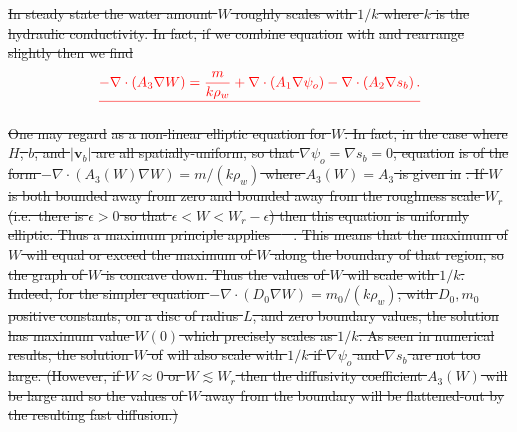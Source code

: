 \documentclass[gmd]{copernicus}   %
\newcommand\bv{\mathbf{v}}
\newcommand{\Div}{\nabla\cdot}
\newcommand\eps{\epsilon}
\newcommand{\grad}{\nabla}
\providecommand{\DIFdel}[1]{{\protect\color{red}\sout{#1}}}                      %
\providecommand{\DIFdelbegin}{} %
\providecommand{\DIFdelend}{} %
\begin{document}
\DIFdelbegin \DIFdel{In steady state the water amount $W$ roughly scales with $1/k$ where $k$ is the hydraulic conductivity.  In fact, if we combine equation }%
\DIFdel{with }%
\DIFdel{and rearrange slightly then we find
}\begin{displaymath}\DIFdel{
-\Div \left(A_3 \grad W\right) = \frac{m}{k \rho_w} + \Div \left(A_1 \grad \psi_o\right) - \Div \left(A_2 \grad s_b\right).  \label{eq:ellipticforWsteadyone}
}\end{displaymath}

\DIFdel{One may regard }%
\DIFdel{as a non-linear elliptic equation for $W$.  In fact, in the case where $H$, $b$, and $|\bv_b|$ are all spatially-uniform, so that $\grad \psi_o = \grad s_b = 0$, equation }%
\DIFdel{is of the form $-\Div \left(A_3(W) \grad W\right) = m/(k \rho_w)$ where $A_3(W) = A_3$ is given in }%
\DIFdel{.  If $W$ is both bounded away from zero and bounded away from the roughness scale $W_r$ (i.e.~there is $\eps>0$ so that $\eps < W < W_r-\eps$) then this equation is uniformly elliptic.  Thus a maximum principle applies \mbox{%
\citep{Evans}
}%
.  This means that the maximum of $W$ will equal or exceed the maximum of $W$ along the boundary of that region, so the graph of $W$ is concave down.  Thus the values of $W$ will scale with $1/k$.  Indeed, for the simpler equation $-\Div \left(D_0 \grad W\right) = m_0/(k \rho_w)$, with $D_0,m_0$ positive constants, on a disc of radius $L$, and zero boundary values, the solution has maximum value $W(0)$ which precisely scales as $1/k$.  As seen in numerical results, the solution $W$ of }%
\DIFdel{will also scale with $1/k$ if $\grad \psi_o$ and $\grad s_b$ are not too large.  (However, if $W\approx 0$  or $W\lesssim W_r$ then the diffusivity coefficient $A_3(W)$ will be large and so the values of $W$ away from the boundary will be flattened-out by the resulting fast diffusion.)
}%

\DIFdelend %
\end{document}
